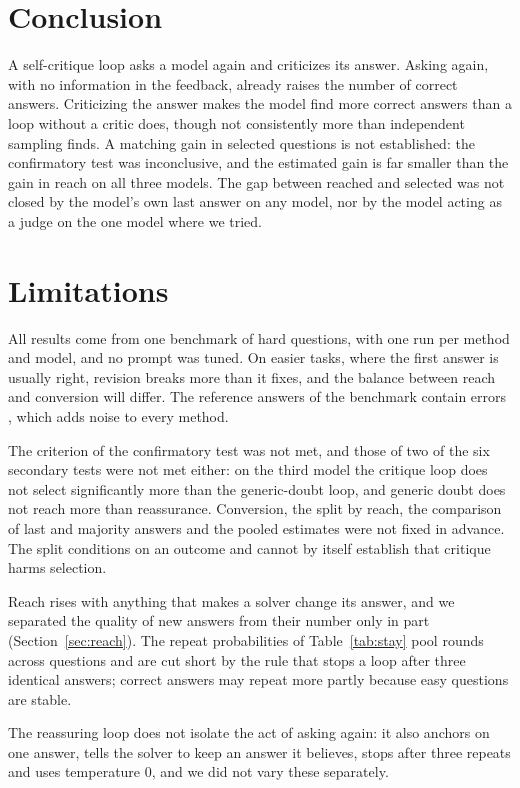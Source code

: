 \documentclass[11pt]{article}
\begin{document}
\section{Conclusion}

A self-critique loop asks a model again and criticizes its answer.
Asking again, with no information in the feedback, already raises the number of correct answers.
Criticizing the answer makes the model find more correct answers than a loop without a critic does, though not consistently more than independent sampling finds.
A matching gain in selected questions is not established: the confirmatory test was inconclusive, and the estimated gain is far smaller than the gain in reach on all three models.
The gap between reached and selected was not closed by the model's own last answer on any model, nor by the model acting as a judge on the one model where we tried.

\section*{Limitations}

All results come from one benchmark of hard questions, with one run per method and model, and no prompt was tuned.
On easier tasks, where the first answer is usually right, revision breaks more than it fixes, and the balance between reach and conversion will differ.
The reference answers of the benchmark contain errors \citep{zhai2026hleverified}, which adds noise to every method.

The criterion of the confirmatory test was not met, and those of two of the six secondary tests were not met either: on the third model the critique loop does not select significantly more than the generic-doubt loop, and generic doubt does not reach more than reassurance.
Conversion, the split by reach, the comparison of last and majority answers and the pooled estimates were not fixed in advance.
The split conditions on an outcome and cannot by itself establish that critique harms selection.

Reach rises with anything that makes a solver change its answer, and we separated the quality of new answers from their number only in part (Section~\ref{sec:reach}).
The repeat probabilities of Table~\ref{tab:stay} pool rounds across questions and are cut short by the rule that stops a loop after three identical answers; correct answers may repeat more partly because easy questions are stable.

The reassuring loop does not isolate the act of asking again: it also anchors on one answer, tells the solver to keep an answer it believes, stops after three repeats and uses temperature 0, and we did not vary these separately.
\end{document}

